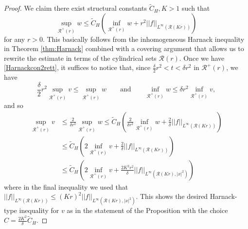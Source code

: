 \documentclass[12pt]{amsart}
\def \r {\mathcal R}
\begin{document}
\begin{proof}
We claim there exist structural constants $\tilde{C}_H, K >1$ such that
\begin{equation}\label{Harnackcon2rett}
\sup_{\r^+(r)} w \leq \tilde{C}_H\left(\inf_{\r^+(r)} w + r^2 ||f||_{L^{\infty}(\r(Kr))}  \right)
\end{equation}
for any $r>0$. This basically follows from the inhomogeneous Harnack inequality in Theorem \ref{thm:Harnack} combined with a covering argument that allows us to rewrite the estimate in terms of the cylindrical sets $\r(r)$. Once we have \eqref{Harnackcon2rett}, it suffices to notice that, since $\frac{\delta}{2} r^2<t<\delta r^2$ in $\r^+(r)$, we have
$$\frac{\delta}{2} r^2 \sup_{\r^+(r)} v \leq \sup_{\r^+(r)} w \qquad \text{and} \qquad \inf_{\r^+(r)} w \leq \delta r^2 \inf_{\r^+(r)} v,$$
and so
\begin{align*}
\sup_{\r^+(r)} v&\leq \frac{2}{\delta r^2} \sup_{\r^+(r)} w \leq \tilde{C}_H\left(\frac{2}{\delta r^2} \inf_{\r^+(r)} w + \frac{2}{\delta} ||f||_{L^{\infty}(\r(Kr))}  \right)\\
&\leq \tilde{C}_H\left( 2 \inf_{\r^+(r)} v + \frac{2}{\delta} ||f||_{L^{\infty}(\r(Kr))}\right) \\
&  \leq  \tilde{C}_H\left( 2 \inf_{\r^+(r)} v + \frac{2K^2 r^2}{\delta} ||f||_{L^{\infty}(\r(Kr),|x|^2)} \right)
\end{align*}
where in the final inequality we used that $||f||_{L^{\infty}(\r(Kr))}\leq (Kr)^2 ||f||_{L^{\infty}(\r(Kr),|x|^2)}$. This shows the desired Harnack-type inequality for $v$ as in the statement of the Proposition with the choice $C=\frac{2K^2}{\delta} \tilde{C}_H$.


\end{proof}
\end{document}
